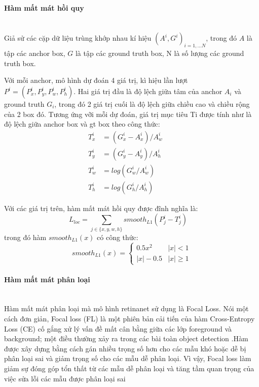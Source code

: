 \documentclass[a4paper, 12pt]{report}
\begin{document}
\paragraph{Hàm mất mát hồi quy} \leavevmode \\

Giả sử các cặp dữ liệu trùng khớp nhau kí hiệu ${(A^i, G^i)}_{i=1,...N}$, trong đó $A$  là tập các anchor box, $G$ là tập các ground truth box, N là số lượng các ground truth box.

Với mỗi anchor, mô hình dự đoán 4 giá trị, kì hiệu lần lượt $P^i = (P^i_x, P^i_y, P^i_w, P^i_h)$. Hai giá trị đầu là độ lệch giữa tâm của anchor $A_{i}$ và ground truth $G_i$, trong đó 2 giá trị cuối là độ lệch giữa chiều cao và chiều rộng của 2 box đó. Tương ứng vỡi mỗi dự đoán, giá trị mục tiêu Ti được tính như là độ lệch giữa anchor box và gt box theo công thức:
\begin{align}
T^i_x &= (G^i_x - A^i_x) / A^i_w \quad & \\
T^i_y &= (G^i_y - A^i_y) / A^i_h & \\
T^i_w &= log(G^i_w / A^i_w) & \\
T^i_h &= log(G^i_h / A^i_h) &
\end{align}

Với các giá trị trên, hàm mất mát hồi quy được đĩnh nghĩa là:
\begin{equation}
	L_{loc} = \sum_{j \in \{x, y, w, h\}}smooth_{L1}(P^i_j - T^i_j) \quad
\end{equation}
trong đó hàm $smooth_{L1}(x)$ có công thức:
\begin{equation}
smooth_{L1}(x) = 
\begin{cases}
0.5x^2 &|x| < 1 \\
|x| - 0.5 &|x| \geq 1
\end{cases}
\end{equation}

\paragraph{Hàm mất mát phân loại} \leavevmode \\

Hàm mất mát phân loại mà mô hình retinanet sử dụng là Focal Loss. Nói một cách đơn giản, Focal loss (FL) là một phiên bản cải tiến của hàm Cross-Entropy Loss (CE) cố gắng xử lý vấn đề mất cân bằng giữa các lớp foreground và background; một điều thường xảy ra trong các bài toàn object detection .Hàm được xây dựng bằng cách gán nhiều trọng số hơn cho các mẫu khó hoặc dễ bị phân loại sai và giảm trọng số cho các mẫu dễ phân loại. Vì vậy, Focal loss làm giảm sự đóng góp tổn thất từ các mẫu dễ phân loại và tăng tầm quan trọng của việc sửa lỗi các mẫu được phân loại sai
\end{document}
